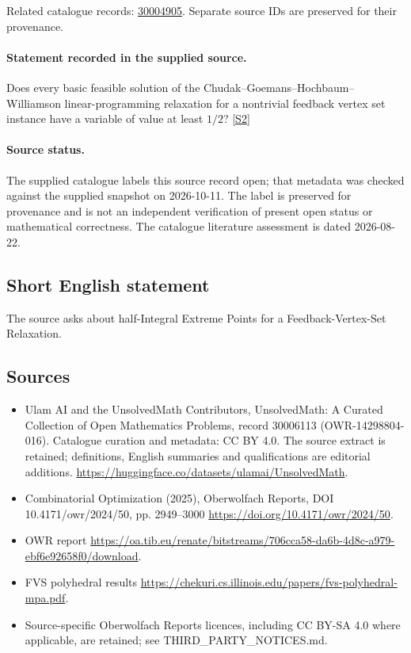 \documentclass[11pt]{article}
\begin{document}
Related catalogue records: \href{https://mehmetmars7.github.io/Erdosproblems-llm-hunter/problem.html?type=open_problems&id=30004905}{30004905}. Separate source IDs are preserved for their provenance.
\paragraph{Statement recorded in the supplied source.}
Does every basic feasible solution of the Chudak–Goemans–Hochbaum–Williamson linear-programming relaxation for a nontrivial feedback vertex set instance have a variable of value at least $1/2$? \href{https://doi.org/10.4171/owr/2024/50}{[S2]}
\paragraph{Source status.}
The supplied catalogue labels this source record open; that metadata was checked against the supplied snapshot on 2026-10-11. The label is preserved for provenance and is not an independent verification of present open status or mathematical correctness. The catalogue literature assessment is dated 2026-08-22.
\subsection{Short English statement}
The source asks about half-Integral Extreme Points for a Feedback-Vertex-Set Relaxation.
\subsection{Sources}
\begin{itemize}
\item[S1] Ulam AI and the UnsolvedMath Contributors, UnsolvedMath: A Curated Collection of Open Mathematics Problems, record 30006113 (OWR-14298804-016). Catalogue curation and metadata: CC BY 4.0. The source extract is retained; definitions, English summaries and qualifications are editorial additions.
\url{https://huggingface.co/datasets/ulamai/UnsolvedMath}.
\item[S2] Combinatorial Optimization (2025), Oberwolfach Reports, DOI 10.4171/owr/2024/50, pp. 2949--3000
\url{https://doi.org/10.4171/owr/2024/50}.
\item[S3] OWR report
\url{https://oa.tib.eu/renate/bitstreams/706cca58-da6b-4d8c-a979-ebf6e92658f0/download}.
\item[S4] FVS polyhedral results
\url{https://chekuri.cs.illinois.edu/papers/fvs-polyhedral-mpa.pdf}.
\item Source-specific Oberwolfach Reports licences, including CC BY-SA 4.0 where applicable, are retained; see THIRD\_PARTY\_NOTICES.md.
\end{itemize}
\end{document}
